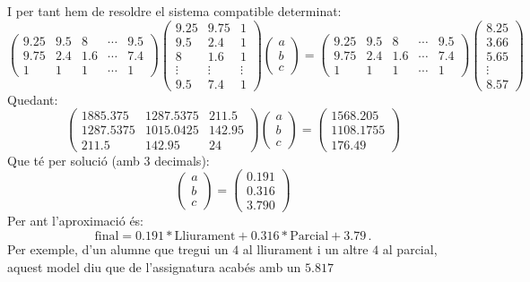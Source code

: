 \begin{exemple}
\[\]
I per tant hem de resoldre el sistema compatible determinat:
\[
\begin{pmatrix}
9.25 & 9.5 & 8 & \cdots & 9.5 \\
9.75 & 2.4 & 1.6 & \cdots & 7.4 \\
1 & 1 & 1 & \cdots & 1
\end{pmatrix}
\begin{pmatrix}
9.25 & 9.75 & 1 \\
9.5 & 2.4 & 1 \\
8 & 1.6 & 1 \\
\vdots & \vdots & \vdots \\
9.5 & 7.4 & 1
\end{pmatrix}
\begin{pmatrix} a \\ b \\ c \end{pmatrix}=
\begin{pmatrix}
9.25 & 9.5 & 8 & \cdots & 9.5 \\
9.75 & 2.4 & 1.6 & \cdots & 7.4 \\
1 & 1 & 1 & \cdots & 1
\end{pmatrix}
\begin{pmatrix} 8.25 \\ 3.66 \\ 5.65 \\ \vdots \\ 8.57 \end{pmatrix}
\]
Quedant:
\[
\left(\begin{array}{ccc}
1885.375 & 1287.5375 & 211.5 \\
1287.5375 & 1015.0425 & 142.95 \\
211.5 & 142.95 & 24
\end{array}\right)
\begin{pmatrix} a \\ b \\ c \end{pmatrix}=
\begin{pmatrix}
1568.205 \\ 1108.1755 \\ 176.49
\end{pmatrix}
\]
Que té per solució (amb 3 decimals):
\[
\begin{pmatrix} a \\ b \\ c \end{pmatrix}=
\begin{pmatrix} 0.191 \\
0.316 \\
3.790 \end{pmatrix}
\]
Per ant l'aproximació és:
\[
\text{final} = 0.191 * \text{Lliurament} + 0.316 * \text{Parcial} + 3.79\, .
\]
Per exemple, d'un alumne que tregui un $4$ al lliurament i un altre $4$ al parcial, aquest model diu que de l'assignatura acabés amb un $5.817$
\end{exemple}


